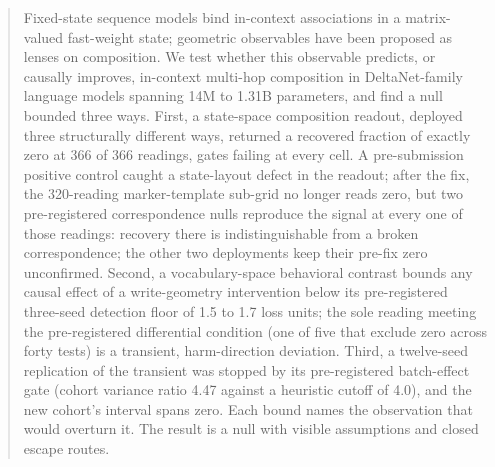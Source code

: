 \begin{abstract}
Fixed-state sequence models bind in-context associations in a matrix-valued
fast-weight state; geometric observables have been proposed as lenses on
composition. We test whether this observable predicts, or causally
improves, in-context multi-hop composition in DeltaNet-family language
models spanning 14M to 1.31B parameters, and find a null bounded three
ways. First, a state-space composition readout, deployed three
structurally different ways, returned a recovered fraction of exactly zero
at 366 of 366 readings, %
gates failing at every cell. %
A pre-submission positive control caught a state-layout defect in the
readout; %
after the fix, the 320-reading marker-template sub-grid no longer reads
zero, %
but two pre-registered correspondence nulls reproduce the signal at every
one of those readings: recovery there is indistinguishable from a broken
correspondence; the other two deployments keep their pre-fix zero
unconfirmed. %
Second, a
vocabulary-space behavioral contrast bounds any causal effect of a
write-geometry intervention below its pre-registered three-seed detection
floor of 1.5 to 1.7 loss units; %
the sole reading meeting the pre-registered differential condition (one of
five that exclude zero across forty tests) is a transient, harm-direction
deviation. Third, a twelve-seed replication of the transient was
stopped by its pre-registered batch-effect gate (cohort variance ratio
4.47 against a heuristic cutoff of 4.0), %
and the new cohort's interval spans zero. Each bound names the observation
that would overturn it. The result is a null with visible assumptions and
closed escape routes.
\end{abstract}
